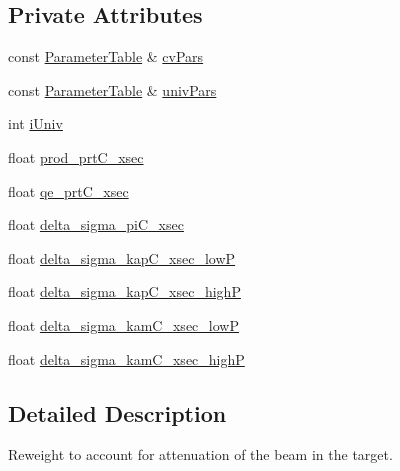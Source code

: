 \subsection*{Private Attributes}
\begin{DoxyCompactItemize}
\item 
const \hyperlink{class_neutrino_flux_reweight_1_1_parameter_table}{Parameter\-Table} \& \hyperlink{class_neutrino_flux_reweight_1_1_target_attenuation_reweighter_a57e907b9b35335e57c20b7280e016725}{cv\-Pars}
\item 
const \hyperlink{class_neutrino_flux_reweight_1_1_parameter_table}{Parameter\-Table} \& \hyperlink{class_neutrino_flux_reweight_1_1_target_attenuation_reweighter_a7c23916d46501cf3e0ff3211830d9412}{univ\-Pars}
\item 
int \hyperlink{class_neutrino_flux_reweight_1_1_target_attenuation_reweighter_ad8c3e794f3e8dec8e728f19accea6dd2}{i\-Univ}
\item 
float \hyperlink{class_neutrino_flux_reweight_1_1_target_attenuation_reweighter_aeffa7cad0d6106661a216901a5304ff8}{prod\-\_\-prt\-C\-\_\-xsec}
\item 
float \hyperlink{class_neutrino_flux_reweight_1_1_target_attenuation_reweighter_a69d6f0a9aae695e7abb4484bf3dce015}{qe\-\_\-prt\-C\-\_\-xsec}
\item 
float \hyperlink{class_neutrino_flux_reweight_1_1_target_attenuation_reweighter_afe869ddec31e4710192f0a990b78c7b6}{delta\-\_\-sigma\-\_\-pi\-C\-\_\-xsec}
\item 
float \hyperlink{class_neutrino_flux_reweight_1_1_target_attenuation_reweighter_abcfaf35e7861c941eb17a22a9fdc867d}{delta\-\_\-sigma\-\_\-kap\-C\-\_\-xsec\-\_\-low\-P}
\item 
float \hyperlink{class_neutrino_flux_reweight_1_1_target_attenuation_reweighter_a1da8f3585af2ed5e282e6f2cd7e613f9}{delta\-\_\-sigma\-\_\-kap\-C\-\_\-xsec\-\_\-high\-P}
\item 
float \hyperlink{class_neutrino_flux_reweight_1_1_target_attenuation_reweighter_a83c1ebd3f9ce871a6aeefb52f9fd1dbc}{delta\-\_\-sigma\-\_\-kam\-C\-\_\-xsec\-\_\-low\-P}
\item 
float \hyperlink{class_neutrino_flux_reweight_1_1_target_attenuation_reweighter_a95594f470ba874e6497c656e73de5af0}{delta\-\_\-sigma\-\_\-kam\-C\-\_\-xsec\-\_\-high\-P}
\end{DoxyCompactItemize}


\subsection{Detailed Description}
Reweight to account for attenuation of the beam in the target. 

